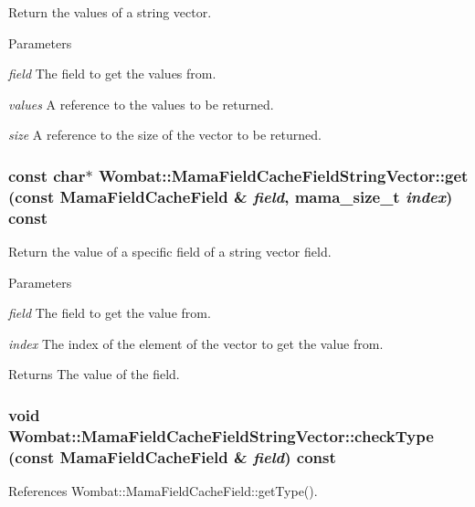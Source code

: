 Return the values of a string vector. 
\begin{DoxyParams}{Parameters}
\item[{\em field}]The field to get the values from. \item[{\em values}]A reference to the values to be returned. \item[{\em size}]A reference to the size of the vector to be returned. \end{DoxyParams}
\hypertarget{classWombat_1_1MamaFieldCacheFieldStringVector_a7bd6adb13c4767f46c36dc312932ba3c}{
\subsubsection[{get}]{\setlength{\rightskip}{0pt plus 5cm}const char$\ast$ Wombat::MamaFieldCacheFieldStringVector::get (const {\bf MamaFieldCacheField} \& {\em field}, \/  {\bf mama\_\-size\_\-t} {\em index}) const}}
\label{classWombat_1_1MamaFieldCacheFieldStringVector_a7bd6adb13c4767f46c36dc312932ba3c}


Return the value of a specific field of a string vector field. 
\begin{DoxyParams}{Parameters}
\item[{\em field}]The field to get the value from. \item[{\em index}]The index of the element of the vector to get the value from. \end{DoxyParams}
\begin{DoxyReturn}{Returns}
The value of the field. 
\end{DoxyReturn}
\hypertarget{classWombat_1_1MamaFieldCacheFieldStringVector_a56939657fa81200b01a8c93a002b22a7}{
\subsubsection[{checkType}]{\setlength{\rightskip}{0pt plus 5cm}void Wombat::MamaFieldCacheFieldStringVector::checkType (const {\bf MamaFieldCacheField} \& {\em field}) const}}
\label{classWombat_1_1MamaFieldCacheFieldStringVector_a56939657fa81200b01a8c93a002b22a7}


References Wombat::MamaFieldCacheField::getType().